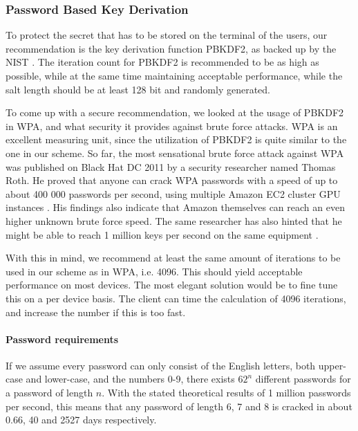 \documentclass[pdftex,english,10pt,b5paper,twoside]{book}
\begin{document}
\subsubsection{Password Based Key Derivation} 
\label{sec:PBKD}

To protect the secret that has to be stored on the terminal of the users, our
recommendation is the key derivation function \ac{PBKDF2}, as backed up by the
\ac{NIST} \cite{pbkdf_nist}. The iteration count for \ac{PBKDF2} is recommended
to be as high as possible, while at the same time maintaining acceptable
performance, while the salt length should be at least 128 bit and randomly
generated. 

To come up with a secure recommendation, we looked at the usage of \ac{PBKDF2}
in \ac{WPA}, and what security it provides against brute force attacks.
\ac{WPA} is an excellent measuring unit, since the utilization of \ac{PBKDF2}
is quite similar to the one in our scheme. So far, the most sensational brute
force attack against \ac{WPA} was published on Black Hat DC 2011 by a security
researcher named Thomas Roth. He proved that anyone can crack \ac{WPA}
passwords with a speed of up to about 400 000 passwords per second, using
multiple Amazon \ac{EC2} cluster \ac{GPU} instances \cite{rothwpa}. His
findings also indicate that Amazon themselves can reach an even higher unknown
brute force speed. The same researcher has also hinted that he might be able to
reach 1 million keys per second on the same equipment \cite{rothblog}.

With this in mind, we recommend at least the same amount of iterations to be
used in our scheme as in \ac{WPA}, i.e. 4096. This should yield acceptable
performance on most devices. The most elegant solution would be to fine tune
this on a per device basis. The client can time the calculation of 4096
iterations, and increase the number if this is too fast.

\paragraph{Password requirements}

If we assume every password can only consist of the English letters, both
upper-case and lower-case, and the numbers 0-9, there exists $62^n$ different
passwords for a password of length $n$. With the stated theoretical results of
1 million passwords per second, this means that any password of length 6, 7 and
8 is cracked in about 0.66, 40 and 2527 days respectively.
\end{document}
